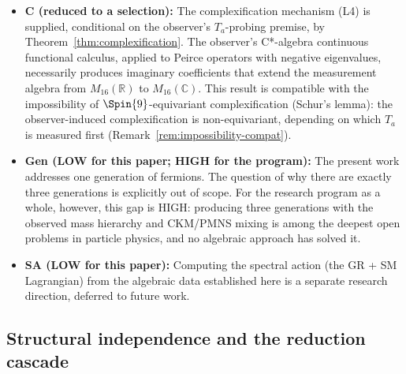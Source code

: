 \begin{itemize}
    $h_n(\mathbb{C})$, $h_n(\mathbb{H})$) still exist as consistent
    mathematical structures and could in principle host other
    arenas; the program selects $\hthree$ as \emph{ours} by
    anthropic restriction, not by uniqueness across all possible
    worlds.  Closing Gap~A in the strong sense would mean deriving
    the observer-grade conditions of Definition~\ref{def:basin}
    directly from the self-modeling axioms, without anthropic input.
    Lemma~\ref{lem:bottleneck} (C*-bottleneck universality) closes
    one structural piece of this: condition~(ii) of
    Definition~\ref{def:basin} is now a theorem about
    h$_3(\mathbb{C}_u)$ as the maximal C*-target.
  \item \textbf{C (reduced to a selection):} The complexification mechanism (L4) is supplied, conditional on the observer's $T_a$-probing premise,
    by Theorem~\ref{thm:complexification}.  The observer's C*-algebra continuous
    functional calculus, applied to Peirce operators with negative
    eigenvalues, necessarily produces imaginary
    coefficients that extend the measurement algebra from
    $M_{16}(\mathbb{R})$ to $M_{16}(\mathbb{C})$.  This result is
    compatible with the impossibility of $\Spin{9}$-equivariant
    complexification (Schur's lemma): the observer-induced
    complexification is non-equivariant, depending on which $T_a$ is
    measured first (Remark~\ref{rem:impossibility-compat}).
  \item \textbf{Gen (LOW for this paper; HIGH for the program):} The
    present work addresses one generation of fermions.  The question of
    why there are exactly three generations is explicitly out of scope.
    For the research program as a whole, however, this gap is HIGH:
    producing three generations with the observed mass hierarchy and
    CKM/PMNS mixing is among the deepest open problems in particle
    physics, and no algebraic approach has solved it.
  \item \textbf{SA (LOW for this paper):} Computing the spectral
    action (the GR + SM Lagrangian) from the algebraic data
    established here is a separate research direction, deferred to
    future work.
\end{itemize}

\subsection{Structural independence and the reduction cascade}\label{sec:gap-independence}

